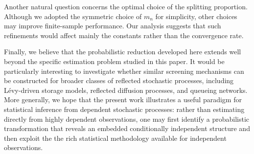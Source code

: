 \documentclass[12pt]{article}
\newcommand{\1}{\mathbf{1}}
\begin{document}
Another natural question concerns the optimal choice of the splitting proportion. Although we adopted the symmetric choice of $m_n$ for simplicity, other choices may improve finite-sample performance. Our analysis suggests that such refinements would affect mainly the constants rather than the convergence rate.

Finally, we believe that the probabilistic reduction developed here extends well beyond the specific estimation problem studied in this paper. It would be particularly interesting to investigate whether similar screening mechanisms can be constructed for broader classes of reflected stochastic processes, including Lévy-driven storage models, reflected diffusion processes, and queueing networks. More generally, we hope that the present work illustrates a useful paradigm for statistical inference from dependent stochastic processes: rather than estimating directly from highly dependent observations, one may first identify a probabilistic transformation that reveals an embedded conditionally independent structure and then exploit the the rich statistical methodology available for independent observations.
\end{document}
